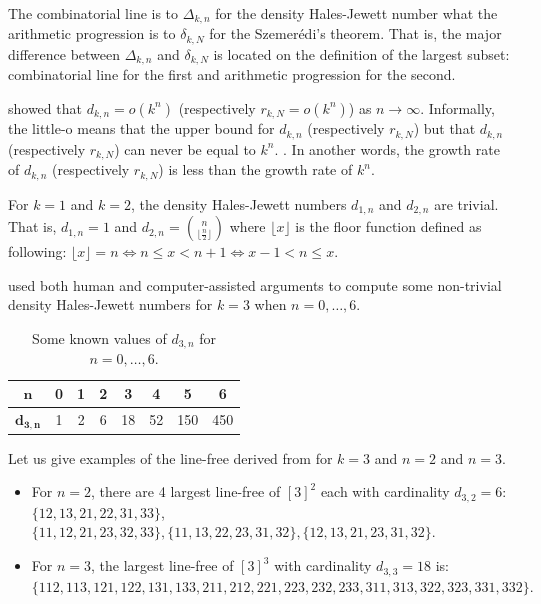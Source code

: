 The combinatorial line is to $\Delta_{k,n}$ for the density Hales-Jewett number
what the arithmetic progression is to $\delta_{k,N}$ for the Szemerédi's theorem. That is, the major  difference between $\Delta_{k,n}$ and $\delta_{k,N}$ is located on the definition of the largest subset: combinatorial line for the first and arithmetic progression for the second. 

\cite*{furstenberg1991density} showed that $d_{k,n}=o(k^n)$ (respectively $r_{k,N}=o(k^n)$) as $n\longrightarrow \infty.$
Informally, the little-o means that the upper bound for $d_{k,n}$ (respectively $r_{k,N}$) but that $d_{k,n}$ (respectively $r_{k,N}$) can never be equal to $k^n.$
.
In another words, the growth rate of $d_{k,n}$ (respectively $r_{k,N}$) is less
than the growth rate of $k^n.$

For $k=1$ and $k=2$, the density Hales-Jewett numbers $d_{1,n}$ and $d_{2,n}$ are trivial.
That is, $d_{1,n}=1$ and $d_{2,n}= {n \choose \lfloor \frac{n}{2} \rfloor}$ where $\lfloor x \rfloor $ is the floor function defined as following: $\lfloor x \rfloor =n \Longleftrightarrow n \leq x < n+1 \Longleftrightarrow  x-1 < n \leq x .$

\cite{polymath2010density} used both human and computer-assisted arguments to compute some non-trivial density Hales-Jewett numbers for $k=3$ when $n= 0,\ldots,6.$

\begin{table}[h]
\centering
\begin{tabular}{|c|c|c|c|c|c|c|c|}
\hline 
$\mathbf{n}$ & 0 & 1 & 2 & 3 & 4 & 5 & 6 \\ 
\hline 
$\mathbf{d_{3,n}}$ & 1 & 2 & 6 & 18 & 52 & 150 & 450 \\ 
\hline 
\end{tabular}
\caption{Some known values of $d_{3,n}$ for $ n= 0,\ldots,6.$}
\end{table} 

Let us give examples of the line-free derived from \cite{polymath2010density} for $k=3$ and $n=2$ and $n=3.$
\begin{itemize}
\item For $n=2$, there are 4 largest line-free of $[3]^2$ each with cardinality $d_{3,2}=6 :$ $ \{12, 13, 21, 22, 31, 33 \}$, $\{11, 12, 21, 23, 32, 33 \}, \{11, 13, 22, 23, 31, 32 \}, \{12, 13, 21, 23, 31, 32 \}.$
\item For $n=3$, the largest line-free of $[3]^3$ with cardinality $d_{3,3}=18$ is: $\{112, 113, 121, 122, 131, 133, 211, 212, 221, 223, 232, 233, 311, 313, 322, 323, 331, 332 \}.$
\end{itemize}

